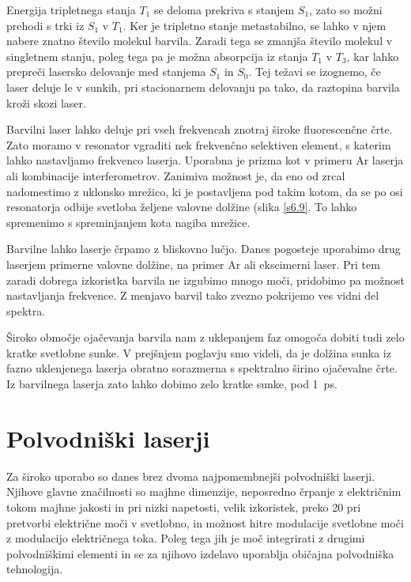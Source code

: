 Energija tripletnega stanja $T_1$ se deloma prekriva s stanjem $S_1$, zato
so možni prehodi s trki iz $S_1$ v $T_1$. Ker je tripletno stanje
metastabilno, se lahko v njem nabere znatno število molekul barvila. Zaradi
tega se zmanjša število molekul v singletnem stanju, poleg tega pa je
možna absorpcija iz stanja $T_1$ v $T_3$, kar lahko prepreči lasersko
delovanje med stanjema $S_1$ in $S_0$. Tej težavi se izognemo, če laser
deluje le v sunkih, pri stacionarnem delovanju pa tako, da raztopina barvila
kroži skozi laser.

Barvilni laser lahko deluje pri vseh frekvencah znotraj široke
fluorescenčne črte. Zato moramo v resonator vgraditi nek frekvenčno
selektiven element, s katerim lahko nastavljamo frekvenco laserja. Uporabna
je prizma kot v primeru Ar laserja ali kombinacije interferometrov. Zanimiva
možnost je, da eno od zrcal nadomestimo z uklonsko mrežico, ki je
postavljena pod takim kotom, da se po osi resonatorja odbije svetloba
željene valovne dolžine (slika \ref{s6.9}. To lahko spremenimo s
spreminjanjem kota nagiba mrežice.

Barvilne lahko laserje črpamo z bliskovno lučjo. Danes pogosteje uporabimo
drug laserjem primerne valovne dolžine, na primer Ar ali ekscimerni laser.
Pri tem zaradi dobrega izkoristka barvila ne izgubimo mnogo moči, pridobimo
pa možnost nastavljanja frekvence. Z menjavo barvil tako zvezno pokrijemo
ves vidni del spektra.

Široko območje ojačevanja barvila nam z uklepanjem faz omogoča dobiti
tudi zelo kratke svetlobne sunke. V prejšnjem poglavju smo videli, da je
dolžina sunka iz fazno uklenjenega laserja obratno sorazmerna s spektralno
širino ojačevalne črte. Iz barvilnega laserja zato lahko dobimo zelo
kratke sunke, pod 1~ps.


\section{Polvodniški laserji}

Za široko uporabo so danes brez dvoma najpomembnejši polvodniški laserji.
Njihove glavne značilnosti so majhne dimenzije, neposredno črpanje z
električnim tokom majhne jakosti in pri nizki napetosti, velik izkoristek,
preko 20%
pri pretvorbi električne moči v svetlobno, in možnost hitre modulacije
svetlobne moči z modulacijo električnega toka. Poleg tega jih je moč
integrirati z drugimi polvodniškimi elementi in se za njihovo izdelavo
uporablja običajna polvodniška tehnologija.

